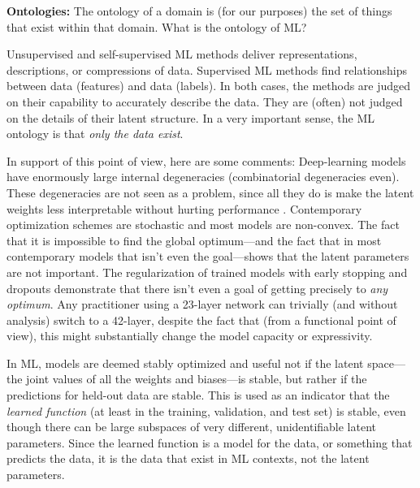 \documentclass{article}
\renewcommand{\paragraph}[1]{\noindent\par\textbf{#1}}
\begin{document}
\paragraph{Ontologies:}
The ontology of a domain is (for our purposes) the set of things that exist within that domain.
What is the ontology of ML?

Unsupervised and self-supervised ML methods deliver representations, descriptions, or compressions of data.
Supervised ML methods find relationships between data (features) and data (labels).
In both cases, the methods are judged on their capability to accurately describe the data.
They are (often) not judged on the details of their latent structure.
In a very important sense, the ML ontology is that \emph{only the data exist}.

In support of this point of view, here are some comments:
Deep-learning models have enormously large internal degeneracies (combinatorial degeneracies even).
These degeneracies are not seen as a problem, since all they do is make the latent weights less interpretable without hurting performance \cite{belkin2019reconciling, bartlett2020benign}.
Contemporary optimization schemes are stochastic \cite{stochastic} and most models are non-convex.
The fact that it is impossible to find the global optimum---and the fact that in most contemporary models that isn't even the goal---shows that the latent parameters are not important.
The regularization of trained models with early stopping \cite{early_stop} and dropouts \cite{dropout} demonstrate that there isn't even a goal of getting precisely to \emph{any optimum}.
Any practitioner using a 23-layer network can trivially (and without analysis) switch to a 42-layer, despite the fact that (from a functional point of view), this might substantially change the model capacity or expressivity.

In ML, models are deemed stably optimized and useful not if the latent space---the joint values of all the weights and biases---is stable, but rather if the predictions for held-out data are stable.
This is used as an indicator that the \emph{learned function} (at least in the training, validation, and test set) is stable, even though there can be large subspaces of very different, unidentifiable latent parameters.
Since the learned function is a model for the data, or something that predicts the data, it is the data that exist in ML contexts, not the latent parameters.
\end{document}
